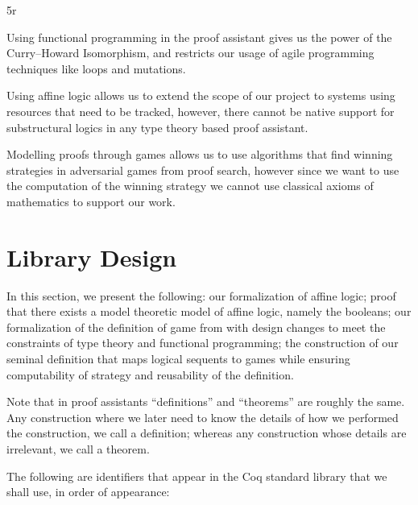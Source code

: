 5r\documentclass{article}
\theoremstyle{definition}
\begin{document}
Using functional programming in the proof assistant gives us the power of the Curry--Howard Isomorphism, and restricts our usage of agile programming techniques like loops and mutations.


Using affine logic allows us to extend the scope of our project to systems using resources that need to be tracked, however, there cannot be native support for substructural logics in any type theory based proof assistant.


Modelling proofs through games allows us to use algorithms that find winning strategies in adversarial games from proof search, however since we want to use the computation of the winning strategy we cannot use classical axioms of mathematics to support our work.

\section{Library Design}

In this section, we present the following: our formalization of affine logic; proof that there exists a model theoretic model of affine logic, namely the booleans; our formalization of the definition of game from \textcite{Blass1992} with design changes to meet the constraints of type theory and functional programming; the construction of our seminal definition that maps logical sequents to games while ensuring computability of strategy and reusability of the definition. 

Note that in proof assistants ``definitions'' and ``theorems'' are roughly the same. Any construction where we later need to know the details of how we performed the construction, we call a definition; whereas any construction whose details are irrelevant, we call a theorem.  

The following are identifiers that appear in the Coq standard library that we shall use, in order of appearance:
\end{document}
